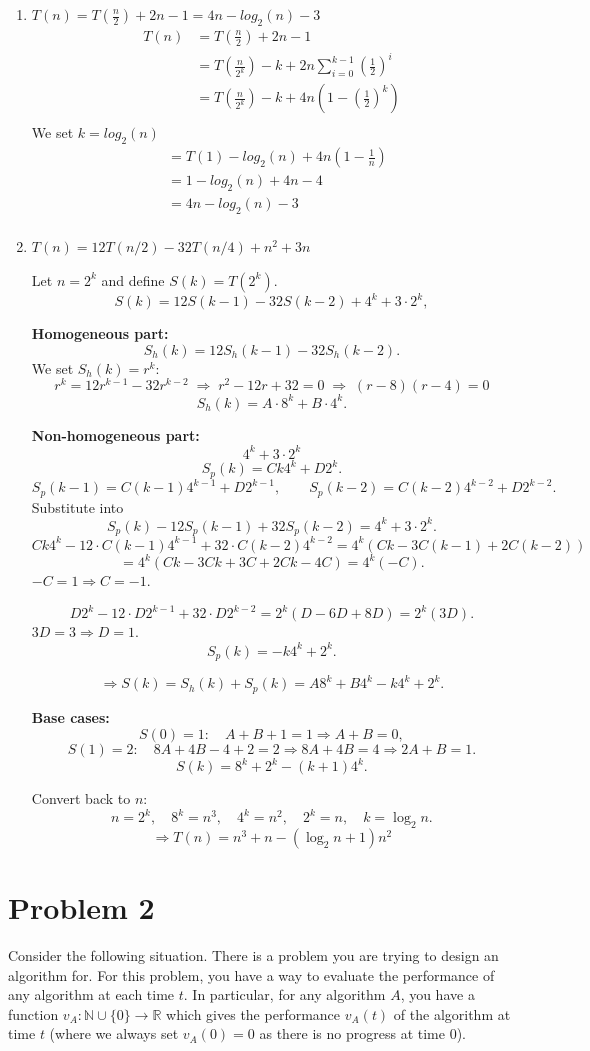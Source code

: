 \documentclass[12pt]{article}
\begin{document}
\begin{enumerate}
\item[(c)] $T(n) = T(\frac{n}{2}) + 2n - 1 = 4n - log_2(n) - 3$
\begin{align*}
  T(n) &= T(\frac{n}{2}) + 2n - 1 \\
  &= T(\frac{n}{2^k}) - k + 2n\sum_{i=0}^{k-1}(\frac{1}{2})^i \\
  &= T(\frac{n}{2^k}) - k + 4n(1-(\frac{1}{2})^k) \\
\end{align*}
We set $k = log_2(n)$
\begin{align*}
  &= T(1) - log_2(n) + 4n(1-\frac{1}{n}) \\
  &= 1 - log_2(n) + 4n - 4 \\
  &= 4n - log_2(n) - 3 \\
\end{align*}
\item[(d)] $T(n)=12T(n/2)-32T(n/4)+n^2+3n$

Let \(n=2^k\) and define \(S(k)=T(2^k)\).
\[
S(k)=12S(k-1)-32S(k-2)+4^k+3\cdot 2^k,
\]

\textbf{Homogeneous part:}
\[
S_h(k)=12S_h(k-1)-32S_h(k-2).
\]
We set \(S_h(k)=r^k\):
\[
r^k=12r^{k-1}-32r^{k-2}\;\Rightarrow\; r^2-12r+32=0
\;\Rightarrow\; (r-8)(r-4)=0
\]
\[
S_h(k)=A\cdot 8^k + B\cdot 4^k.
\]

\textbf{Non-homogeneous part:}
\[4^k+3\cdot 2^k\]
\[
S_p(k)=Ck4^k + D2^k.
\]
\[
S_p(k-1)=C(k-1)4^{k-1}+D2^{k-1},\qquad
S_p(k-2)=C(k-2)4^{k-2}+D2^{k-2}.
\]
Substitute into
\[
S_p(k)-12S_p(k-1)+32S_p(k-2)=4^k+3\cdot 2^k.
\]
\[
Ck4^k-12\cdot C(k-1)4^{k-1}+32\cdot C(k-2)4^{k-2}
=4^k\left(Ck-3C(k-1)+2C(k-2)\right)
\]
\[
=4^k\left(Ck-3Ck+3C+2Ck-4C\right)=4^k(-C).
\]
\(-C=1\Rightarrow C=-1\).

\[
D2^k-12\cdot D2^{k-1}+32\cdot D2^{k-2}
=2^k\left(D-6D+8D\right)=2^k(3D).
\]
\(3D=3\Rightarrow D=1\).
\[
S_p(k)=-k4^k+2^k.
\]

\[
\Rightarrow S(k)=S_h(k)+S_p(k)=A8^k+B4^k-k4^k+2^k.
\]

\textbf{Base cases:}
\[
S(0)=1:\quad A+B+1=1 \Rightarrow A+B=0,
\]
\[
S(1)=2:\quad 8A+4B-4+2=2 \Rightarrow 8A+4B=4 \Rightarrow 2A+B=1.
\]
\[
S(k)=8^k+2^k-(k+1)4^k.
\]

Convert back to \(n\):
\[
n=2^k,\quad 8^k=n^3,\quad 4^k=n^2,\quad 2^k=n,\quad k=\log_2 n.
\]
\[
\Rightarrow T(n)=n^3+n-(\log_2 n+1)n^2
\]
\end{enumerate}

\section*{Problem 2}
Consider the following situation. There is a problem you are trying to design an algorithm for. For this problem, you have a way to evaluate the performance of any algorithm at each time $t$. In particular, for any algorithm $A$, you have a function $v_A: \mathbb{N} \cup \{0\} \to \mathbb{R}$ which gives the performance $v_A(t)$ of the algorithm at time $t$ (where we always set $v_A(0) = 0$ as there is no progress at time $0$). 
\end{document}
